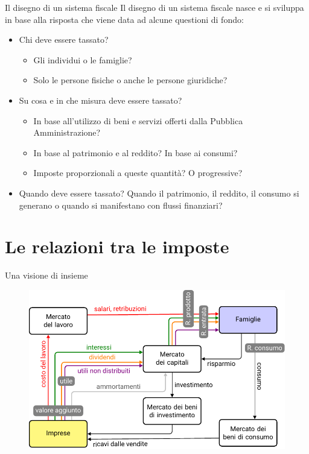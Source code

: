 \documentclass[aspectratio=64,12pt]{beamer}
\begin{document}
\begin{frame}{Il disegno di un sistema fiscale}
Il disegno di un sistema fiscale nasce e si sviluppa in base alla
risposta che viene data ad alcune questioni di fondo:
\begin{itemize}
\item \alert{Chi} deve essere tassato?
\begin{itemize}
\item Gli individui o le famiglie?
\item Solo le persone fisiche o anche le persone giuridiche?
\end{itemize}
\item \alert{Su cosa} e \alert{in che misura} deve essere tassato?\\[0pt]
\begin{itemize}
\item In base all'utilizzo di beni e servizi offerti dalla Pubblica Amministrazione?
\item In base al patrimonio e al reddito? In base ai consumi?
\item Imposte proporzionali a queste quantità? O progressive?
\end{itemize}
\item \alert{Quando} deve essere tassato?  Quando il patrimonio, il reddito, il consumo
si generano o quando si manifestano con flussi finanziari?
\end{itemize}
\end{frame}

\section{Le relazioni tra le imposte}

\begin{frame}{Una visione di insieme}
\begin{figure}[htbp]
\centering
\includegraphics[width=\textwidth]{./figure/flussi-imposte-1.pdf}
\end{figure}
\end{frame}
\end{document}
